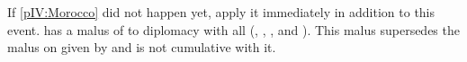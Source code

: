 
\effetlong
\aparag If \ref{pIV:Morocco} did not happen yet, apply it immediately in
addition to this event.
\aparag \TUR has a malus of  to diplomacy with all \Barbaresques
(\paysCyrenaique, \paysTripoli, \paysTunisie, \paysAlgerie and \paysMaroc).
\bparag This malus supersedes the malus on \paysmaroc given by
 and is not cumulative with it.

\stopevents


